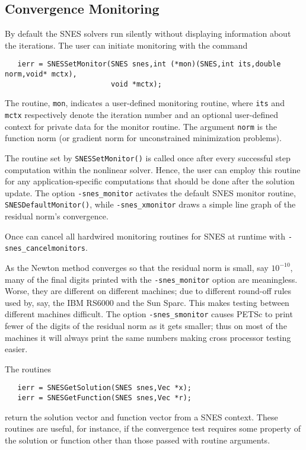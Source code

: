 \subsection{Convergence Monitoring}
\label{sec:snesmonitor}

By default the SNES solvers run silently without displaying information
about the iterations. The user can initiate monitoring with the
command  
\begin{verbatim}
   ierr = SNESSetMonitor(SNES snes,int (*mon)(SNES,int its,double norm,void* mctx),
                         void *mctx);
\end{verbatim}
The routine, {\tt mon}, indicates a user-defined monitoring routine,
where {\tt its} and {\tt mctx} respectively denote the iteration
number and an optional user-defined context for private data for the
monitor routine.  The argument {\tt norm} is the function norm (or
gradient norm for unconstrained minimization problems).

The routine set by {\tt SNESSetMonitor()} is called once after every
successful step computation within the nonlinear solver.  Hence, the
user can employ this routine for any application-specific computations
that should be done after the solution update. The option
{\tt -snes\_monitor}  activates the default
SNES monitor routine, {\tt SNESDefaultMonitor()}, 
while {\tt -snes\_xmonitor}  draws
a simple line graph of the residual norm's convergence.

Once can cancel all hardwired monitoring routines for SNES at runtime with 
{\tt -snes\_cancelmonitors}. 

As the Newton method converges so that the residual norm is small,
say $ 10^{-10} $, many of the final digits printed with the {\tt -snes\_monitor}
option are meaningless. Worse, they are different on different 
machines; due to different round-off rules used by, say, the IBM RS6000
and the Sun Sparc. This makes testing between different machines
difficult. The option {\tt -snes\_smonitor} 
causes PETSc to print fewer of the digits of the residual norm 
as it gets smaller; thus on most of the machines it will always
print the same numbers making cross processor testing easier.

The routines  
\begin{verbatim}
   ierr = SNESGetSolution(SNES snes,Vec *x);
   ierr = SNESGetFunction(SNES snes,Vec *r);
\end{verbatim}
return the solution vector and function vector from a SNES context. 
These routines are useful, for instance, if the convergence test requires 
some property of the solution or function other than those passed with
routine arguments.

